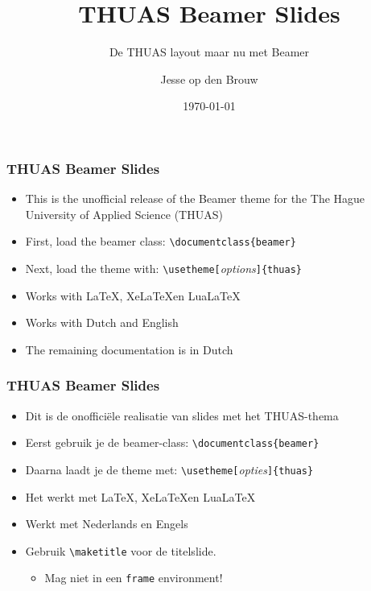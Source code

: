 \documentclass[fleqn,aspectratio=169,dutch,10pt]{beamer}
\title{THUAS Beamer Slides}
\subtitle{De THUAS layout maar nu met Beamer}
\author{Jesse op den Brouw}
\date{\today}
\begin{document}
\maketitle


\begin{frame}[fragile]
\frametitle{THUAS Beamer Slides}
\begin{itemize}
\item This is the unofficial release of the Beamer theme for the The Hague University of Applied Science (THUAS)
\item First, load the beamer class: \lstinline|\documentclass{beamer}|
\item Next, load the theme with: \lstinline|\usetheme[|\emph{\small options}\lstinline|]{thuas}|
\item Works with \LaTeX, Xe\LaTeX en Lua\LaTeX
\item Works with Dutch and English
\item The remaining documentation is in Dutch
\end{itemize}
\end{frame}


\begin{frame}[fragile]
\frametitle{THUAS Beamer Slides}
\begin{itemize}
\item Dit is de onofficiële realisatie van slides met het THUAS-thema
\item Eerst gebruik je de beamer-class: \lstinline|\documentclass{beamer}|
\item Daarna laadt je de theme met: \lstinline|\usetheme[|\emph{\small opties}\lstinline|]{thuas}|
\item Het werkt met \LaTeX, Xe\LaTeX en Lua\LaTeX
\item Werkt met Nederlands en Engels
\item Gebruik \lstinline|\maketitle| voor de titelslide.
\begin{itemize}
\item Mag niet in een \lstinline|frame| environment!
\end{itemize}
\end{itemize}
\end{frame}
\end{document}
